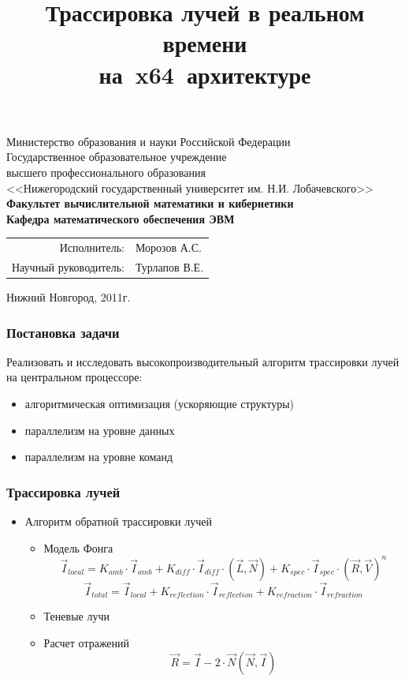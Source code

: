 \documentclass[utf8, 12pt]{beamer}
\title{Трассировка лучей в реальном времени \\ на~x64~архитектуре}
\author{}\date{}
\begin{document}
\begin{frame}
\begin{center}
{\tiny
Министерство образования и науки Российской Федерации\\ 
Государственное образовательное учреждение \\ 
высшего профессионального образования \\ 
<<Нижегородский государственный университет им. Н.И. Лобачевского>>\\
\bf{Факультет вычислительной математики и кибернетики \\
Кафедра математического обеспечения ЭВМ} \\
}
\end{center}
\titlepage
\vspace*{-1cm}
\begin{flushright}
\begin{tabular}{rl}
Исполнитель: & Морозов А.С. \\
Научный руководитель: & Турлапов В.Е.
\end{tabular}
\end{flushright}
\vspace*{1.75cm}
\begin{center}
\small Нижний Новгород, 2011г.
\end{center}
\end{frame}

\begin{frame}
\frametitle{Постановка задачи}
Реализовать и исследовать высокопроизводительный алгоритм трассировки лучей на центральном процессоре:
\begin{itemize}
\item алгоритмическая оптимизация (ускоряющие структуры)
\item параллелизм на уровне данных
\item параллелизм на уровне команд
\end{itemize}
\end{frame}

\begin{frame}
\frametitle{Трассировка лучей}
\begin{itemize}
\item Алгоритм обратной трассировки лучей
\begin{itemize}
\item Модель Фонга
$$
 \vec{I}_{local} =  K_{amb} \cdot \vec{I}_{amb} +  K_{diff} \cdot \vec{I}_{diff} \cdot \left( \vec{L},\vec{N} \right) + K_{spec} \cdot \vec{I}_{spec} \cdot \left( \vec{R},\vec{V} \right)^n
$$
$$
 \vec{I}_{total} = \vec{I}_{local} + K_{reflection} \cdot \vec{I}_{reflection} + K_{refraction} \cdot \vec{I}_{refraction}
$$
\item Теневые лучи
\item Расчет отражений
$$
\vec{R} = \vec{I} - 2 \cdot \vec{N} (\vec{N} , \vec{I})
$$
\end{itemize}
\end{itemize}
\end{frame}
\end{document}
